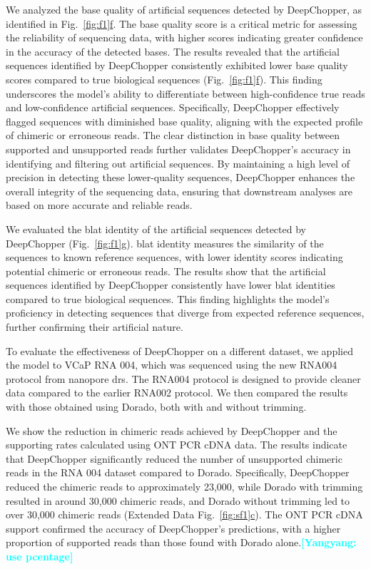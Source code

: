 \documentclass[pdflatex, sn-mathphys-num, lineno]{sn-jnl}%
\newcommand{\yy}[1]{\textcolor{cyan}{\textbf{[Yangyang: #1]}}}
\newcommand{\figref}[2]{Fig.~\hyperref[#1]{\ref*{#1}#2}}
\newcommand{\edfigref}[2]{Extended Data Fig.~\hyperref[#1]{\ref*{#1}#2}}
\theoremstyle{thmstyleone}%
\theoremstyle{thmstyletwo}%
\theoremstyle{thmstylethree}%
\begin{document}
We analyzed the base quality of artificial sequences detected by DeepChopper, as identified in \figref{fig:f1}{f}.
The base quality score is a critical metric for assessing the reliability of sequencing data, with higher scores indicating greater confidence in the accuracy of the detected bases.
The results revealed that the artificial sequences identified by DeepChopper consistently exhibited lower base quality scores compared to true biological sequences (\figref{fig:f1}{f}).
This finding underscores the model's ability to differentiate between high-confidence true reads and low-confidence artificial sequences.
Specifically, DeepChopper effectively flagged sequences with diminished base quality, aligning with the expected profile of chimeric or erroneous reads.
The clear distinction in base quality between supported and unsupported reads further validates DeepChopper's accuracy in identifying and filtering out artificial sequences.
By maintaining a high level of precision in detecting these lower-quality sequences, DeepChopper enhances the overall integrity of the sequencing data, ensuring that downstream analyses are based on more accurate and reliable reads.

We evaluated the \gls{blat} identity of the artificial sequences detected by DeepChopper (\figref{fig:f1}{g}).
\gls{blat} identity measures the similarity of the sequences to known reference sequences, with lower identity scores indicating potential chimeric or erroneous reads.
The results show that the artificial sequences identified by DeepChopper consistently have lower \gls{blat} identities compared to true biological sequences.
This finding highlights the model's proficiency in detecting sequences that diverge from expected reference sequences, further confirming their artificial nature.


To evaluate the effectiveness of DeepChopper on a different dataset, we applied the model to VCaP RNA 004, which was sequenced using the new RNA004 protocol from nanopore \gls{drs}.
The RNA004 protocol is designed to provide cleaner data compared to the earlier RNA002 protocol.
We then compared the results with those obtained using Dorado, both with and without trimming.

We show the reduction in chimeric reads achieved by DeepChopper and the supporting rates calculated using ONT PCR cDNA data.
The results indicate that DeepChopper significantly reduced the number of unsupported chimeric reads in the RNA 004 dataset compared to Dorado.
Specifically, DeepChopper reduced the chimeric reads to approximately 23,000, while Dorado with trimming resulted in around 30,000 chimeric reads, and Dorado without trimming led to over 30,000 chimeric reads (\edfigref{fig:sf1}{c}).
The ONT PCR cDNA support confirmed the accuracy of DeepChopper's predictions, with a higher proportion of supported reads than those found with Dorado alone.\yy{use pcentage}
\end{document}
